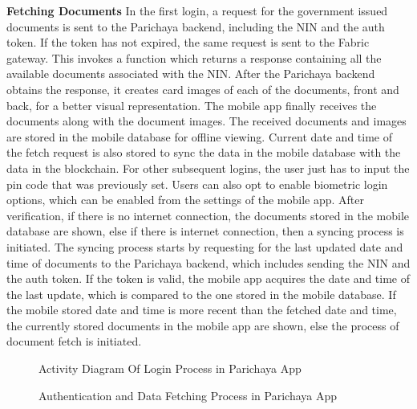 \textbf{Fetching Documents}\newline
In the first login, a request for the government issued documents is sent to the Parichaya backend, including the NIN and the auth token. If the token has not expired, the same request is sent to the Fabric gateway. This invokes a function which returns a response containing all the available documents associated with the NIN. After the Parichaya backend obtains the response, it creates card images of each of the documents, front and back, for a better visual representation. The mobile app finally receives the documents along with the document images. The received documents and images are stored in the mobile database for offline viewing. Current date and time of the fetch request is also stored to sync the data in the mobile database with the data in the blockchain.\newline
For other subsequent logins, the user just has to input the pin code that was previously set. Users can also opt to enable biometric login options, which can be enabled from the settings of the mobile app. After verification, if there is no internet connection, the documents stored in the mobile database are shown, else if there is internet connection, then a syncing process is initiated. The syncing process starts by requesting for the last updated date and time of documents to the Parichaya backend, which includes sending the NIN and the auth token. If the token is valid, the mobile app acquires the date and time of the last update, which is compared to the one stored in the mobile database. If the mobile stored date and time is more recent than the fetched date and time, the currently stored documents in the mobile app are shown, else the process of document fetch is initiated.
  \begin{figure}[H]
\centerline{}
\caption{Activity Diagram Of Login Process in Parichaya App}

\label{fig: MobileActivity.svg}
\end{figure}
  \begin{figure}[H]
\centerline{}
\caption{Authentication and Data Fetching Process in Parichaya App}

\label{fig: example}
\end{figure}


